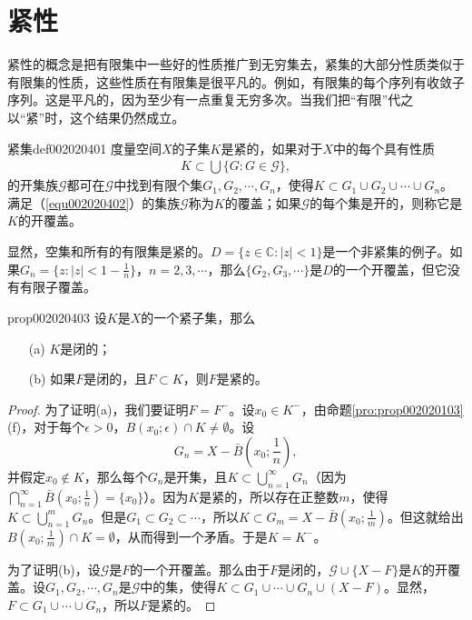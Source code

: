 \section{紧性}\label{section0020204}
紧性的概念是把有限集中一些好的性质推广到无穷集去，紧集的大部分性质类似于有限集的性质，这些性质在有限集是很平凡的。例如，有限集的每个序列有收敛子序列。这是平凡的，因为至少有一点重复无穷多次。当我们把“有限”代之以“紧”时，这个结果仍然成立。

\begin{definition}{紧集}{def002020401}
度量空间$X$的子集$K$是紧的，如果对于$X$中的每个具有性质
\begin{gather}\label{equ002020402}
K \subset \bigcup\{G: G \in \mathscr{G}\},
\end{gather}
的开集族$\mathscr{G}$都可在$\mathscr{G}$中找到有限个集$G_1, G_2, \cdots, G_n$，使得$K \subset G_1 \cup G_2 \cup \cdots \cup G_n$。满足（\ref{equ002020402}）的集族$\mathscr{G}$称为$K$的覆盖；如果$\mathscr{G}$的每个集是开的，则称它是$K$的开覆盖。
\end{definition}

显然，空集和所有的有限集是紧的。$D = \{z \in \mathbb{C}:|z|<1\}$是一个非紧集的例子。如果$G_n = \big\{z : |z| < 1 - \frac{1}{n}\big\}$，$n=2,3,\cdots$，那么$\{G_2, G_3, \cdots\}$是$D$的一个开覆盖，但它没有有限子覆盖。

\begin{proposition}{}{prop002020403}
设$K$是$X$的一个紧子集，那么
\begin{enumerate}
\item[(a)]$K$是闭的；
\item[(b)]如果$F$是闭的，且$F \subset K$，则$F$是紧的。
\end{enumerate}
\end{proposition}

\begin{proof}
为了证明(a)，我们要证明$F = F^-$。设$x_0 \in K^-$，由命题\ref{pro:prop002020103}(f)，对于每个$\epsilon > 0$，$B(x_0;\epsilon) \cap K \neq \emptyset$。设
\[
G_n = X - \bar{B}(x_0; \frac{1}{n}),
\]
并假定$x_0 \not\in K$，那么每个$G_n$是开集，且$K \subset \bigcup_{n=1}^{\infty}{G_n}$（因为$\bigcap_{n=1}^{\infty}{\bar{B}(x_0; \frac{1}{n})} = \{x_0\}$）。因为$K$是紧的，所以存在正整数$m$，使得$K \subset \bigcup_{n=1}^{m}{G_n}$。但是$G_1 \subset G_2 \subset \cdots$，所以$K \subset G_m = X - \bar{B}(x_0;\frac{1}{m})$。但这就给出$B(x_0; \frac{1}{m}) \cap K = \emptyset$，从而得到一个矛盾。于是$K = K^-$。

为了证明(b)，设$\mathscr{G}$是$F$的一个开覆盖。那么由于$F$是闭的，$\mathscr{G} \cup \{X-F\}$是$K$的开覆盖。设$G_1, G_2, \cdots, G_n$是$\mathscr{G}$中的集，使得$K \subset G_1 \cup \cdots \cup G_n \cup (X-F)$。显然，$F \subset G_1 \cup \cdots \cup G_n$，所以$F$是紧的。
\end{proof}


